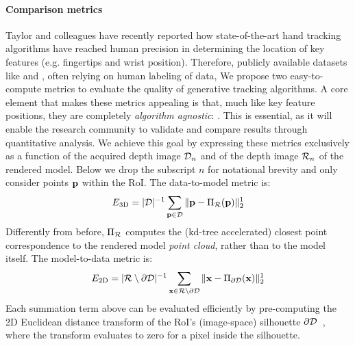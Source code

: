 \paragraph{Comparison metrics}
Taylor and colleagues  have recently reported how state-of-the-art hand tracking algorithms have reached human precision in determining the location of key features (e.g. fingertips and wrist position). 
Therefore, publicly available datasets like \cite{tompson2014real} and \cite{sridhar2013multicam}, often relying on human labeling of data, 
% 
We propose two easy-to-compute metrics to evaluate the quality of generative tracking algorithms. A core element that makes these metrics appealing is that, much like key feature positions, they are completely \emph{algorithm agnostic}: . This is essential, as it will enable the research community to validate and compare results through quantitative analysis. 
% 
We achieve this goal by expressing these metrics exclusively as a function of the acquired depth image $\mathcal{D}_n$ and of the depth image $\mathcal{R}_{n}$ of the rendered model. 
Below we drop the subscript $n$ for notational brevity and only consider points  $\mathbf{p}$ within the RoI.
% 
The data-to-model metric is: %
% 
\begin{equation}
E_\text{3D} = |\mathcal{D}|^{-1} \sum_{\mathbf{p} \in \mathcal{D}} \| \mathbf{p} - \Pi_{\mathcal{R}}(\mathbf{p}) \|_2^1
\label{eq:metric1}
\end{equation}
% 
Differently from before, $\Pi_{\mathcal{R}}$ computes the (kd-tree accelerated) closest point correspondence to the rendered model \emph{point cloud}, rather than to the model itself. 
% 
The model-to-data metric is: %
\begin{eqnarray}
E_\text{2D} = |\mathcal{R} \setminus \partial\mathcal{D}|^{-1} 
\sum_{\mathbf{x} \in \mathcal{R} \setminus \partial\mathcal{D}} \| \mathbf{x} - \Pi_{\partial\mathcal{D}}(\mathbf{x}) \|^1_2
\label{eq:metric2}
\end{eqnarray}
%
Each summation term above can be evaluated efficiently by pre-computing the 2D Euclidean distance transform of the RoI's (image-space) silhouette $\partial \mathcal{D}$~\cite{tagliasacchi2015robust}, where the transform evaluates to zero for a pixel inside the silhouette.
% 


